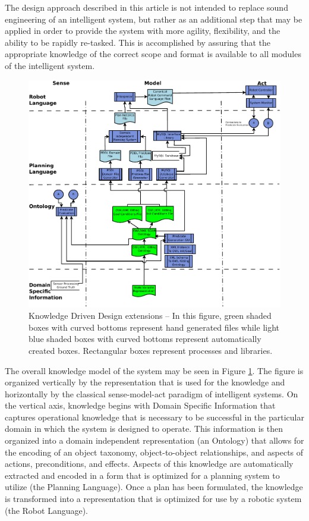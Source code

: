 The design approach described in this article is not intended to
replace sound engineering of an intelligent system, but rather as
an additional step that may be applied in order to provide
the system with more agility, flexibility, and the ability to be rapidly
re-tasked. This is accomplished by assuring that the appropriate knowledge
of the correct scope and format is available to all modules of the
intelligent system.

\begin{figure}[ht!]
\begin{center}
\includegraphics[width=13cm]{images/KnowledgeDrivenRobotics.pdf}
\caption{Knowledge Driven Design extensions -- In this figure, green shaded boxes with curved bottoms
represent hand generated files while
light blue shaded boxes with curved bottoms represent automatically created boxes. Rectangular
boxes represent processes and libraries.}
\label{fig:DesignArchitecture}
\end{center}
\end{figure}

The overall knowledge model of the system may be seen in Figure \ref{fig:DesignArchitecture}.
The figure is organized vertically by the representation that is used for the knowledge
and horizontally by the classical sense-model-act paradigm of intelligent systems.
On the vertical axis, knowledge begins with Domain Specific Information that captures
operational knowledge that is necessary to be successful in the particular domain in which
the system is designed to operate. This information is then organized into a domain
independent representation (an Ontology) that allows for the encoding of an object
taxonomy, object-to-object
relationships, and aspects of actions, preconditions, and effects.
Aspects of this
knowledge are automatically extracted and encoded in a form that is optimized for
a planning system to utilize (the Planning Language). Once a plan has been formulated,
the knowledge is transformed into a representation that is optimized for use by a robotic system
(the Robot Language).

